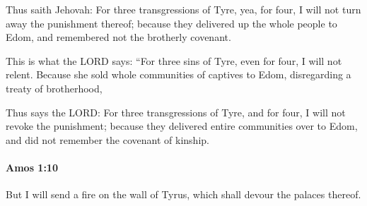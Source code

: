 			\begin{versebox}
					\item[BHS] 
					\item[LXX] 
					\item[ASV] Thus saith Jehovah: For three transgressions of Tyre, yea, for four, I will not turn away the punishment thereof; because they delivered up the whole people to Edom, and remembered not the brotherly covenant.
					\item[NIV] This is what the LORD says: “For three sins of Tyre, even for four, I will not relent. Because she sold whole communities of captives to Edom, disregarding a treaty of brotherhood,
					\item[NRSV] Thus says the LORD: For three transgressions of Tyre, and for four, I will not revoke the punishment; because they delivered entire communities over to Edom, and did not remember the covenant of kinship.
			\end{versebox}

		\paragraph{Amos 1:10} %
			\label{AMOS-1-10}

			But I will send a fire on the wall of Tyrus, which shall devour the palaces thereof.

